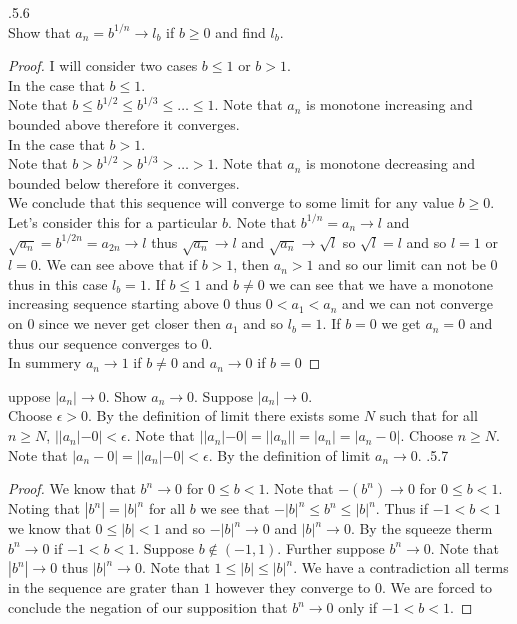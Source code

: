 \documentclass[12pt]{article}
\makeatletter
\theoremstyle{homework}
\newenvironment{exercise}[1]
{\def\@currentlabel{#1}\exercisecore}
{\endexercisecore}
\makeatother
\begin{document}
\begin{exercise}

2.5.6\\
Show that $a_n=b^{1/n}\rightarrow l_b$ if $b\geq 0$ and find $l_b$.
\end{exercise}
\begin{proof}
I will consider two cases $b\leq 1$ or $b>1$.\\
In the case that $b\leq 1$.\\
Note that $b\leq b^{1/2}\leq b^{1/3}\leq \dots\leq 1$.  Note that $a_n$ is monotone increasing and bounded above therefore it converges.\\
In the case that $b > 1$.\\
Note that $b>b^{1/2}>b^{1/3}>\dots>1$.  Note that $a_n$ is monotone decreasing and bounded below therefore it converges.\\
We conclude that this sequence will converge to some limit for any value $b\geq 0$.  Let's consider this for a particular $b$.  Note that $b^{1/n}=a_n\rightarrow l$ and $\sqrt{a_n}=b^{1/2n}=a_{2n}\rightarrow l$ thus $\sqrt{a_n} \rightarrow l$ and $\sqrt{a_n} \rightarrow \sqrt{l}$ so $\sqrt{l}=l$ and so $l=1$ or $l=0$.  We can see above that if $b > 1$, then $a_n>1$ and so our limit can not be $0$ thus in this case $l_b=1$.  If $b\leq 1$ and $b\neq 0$ we can see that we have a monotone increasing sequence starting above $0$ thus $0<a_1<a_n$ and we can not converge on $0$ since we never get closer then $a_1$ and so $l_b=1$.  If $b=0$ we get $a_n=0$ and thus our sequence converges to $0$.\\
In summery $a_n\rightarrow 1$ if $b\neq 0$ and $a_n\rightarrow 0$ if $b= 0$
\end{proof}
\begin{exercise}

Suppose $|a_n|\rightarrow 0$.  Show $a_n \rightarrow 0$.
\end{exercise}
Suppose $|a_n|\rightarrow 0$.\\
Choose $\epsilon>0$.  By the definition of limit there exists some $N$ such that for all $n\geq N$, $||a_n|-0|<\epsilon$.  Note that $||a_n|-0|=||a_n||=|a_n|=|a_n-0|$.  Choose $n\geq N$.  Note that $|a_n-0|=||a_n|-0|<\epsilon$.  By the definition of limit $a_n \rightarrow 0$.
\begin{exercise}

2.5.7\\
\end{exercise}
\begin{proof}
We know that $b^n\rightarrow 0$ for $0\leq b<1$.  Note that $-(b^n)\rightarrow 0$ for $0\leq b<1$.  Noting that $|b^n|=|b|^n$ for all $b$ we see that $-|b|^n\leq b^n \leq |b|^n$.  Thus if $-1<b<1$ we know that $0\leq |b|<1$ and so $-|b|^n\rightarrow 0$ and $|b|^n\rightarrow 0$.  By the squeeze therm $b^n\rightarrow 0$ if $-1<b<1$.  Suppose $b\not\in (-1,1)$.  Further suppose $b^n\rightarrow 0$.  Note that $|b^n|\rightarrow 0$ thus $|b|^n\rightarrow 0$.  Note that $1\leq |b|\leq |b|^n$.  We have a contradiction all terms in the sequence are grater than $1$ however they converge to $0$.  We are forced to conclude the negation of our supposition that $b^n\rightarrow 0$ only if $-1< b<1$.
\end{proof}
\end{document}
